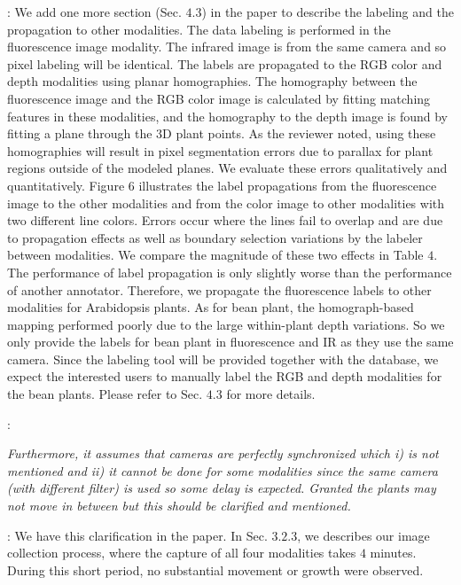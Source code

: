 \documentclass[11pt,letterpaper]{article}
\newcounter{reviewcounter}
\newenvironment{review}
{\noindent {\bf Comment~\arabic{reviewcounter}}:\addtocounter{reviewcounter}{1}\itshape}
{\vspace{0.8em}}
\newenvironment{response}
{\noindent {\bf Response}: \color{black}}
{\color{black} \vspace{1.6em}}
\begin{document}
\begin{response}
We add one more section (Sec. $4.3$) in the paper to describe the labeling and the propagation to other modalities.
The data labeling is performed in the fluorescence image modality.
The infrared image is from the same camera and so pixel labeling will be identical.
The labels are propagated to the RGB color and depth modalities using planar homographies.
The homography between the fluorescence image and the RGB color image is calculated by fitting matching features in these modalities, and the homography to the depth image is found by fitting a plane through the $3$D plant points.
As the reviewer noted, using these homographies will result in pixel segmentation errors due to parallax for plant regions outside of the modeled planes.
We evaluate these errors qualitatively and quantitatively.
Figure $6$ illustrates the label propagations from the fluorescence image to the other modalities and from the color image to other modalities with two different line colors.
Errors occur where the lines fail to overlap and are due to propagation effects as well as boundary selection variations by the labeler between modalities.
We compare the magnitude of these two effects in Table $4$.
The performance of label propagation is only slightly worse than the performance of another annotator.
Therefore, we propagate the fluorescence labels to other modalities for Arabidopsis plants.
As for bean plant, the homograph-based mapping performed poorly due to the large within-plant depth variations.
So we only provide the labels for bean plant in fluorescence and IR as they use the same camera.
Since the labeling tool will be provided together with the database, we expect the interested users to manually label the RGB and depth modalities for the bean plants.
Please refer to Sec. $4.3$ for more details.
\end{response}


\begin{review}
Furthermore, it assumes that cameras are perfectly synchronized which i) is not mentioned and ii) it cannot be done for some modalities since the same camera (with different filter) is used so some delay is expected.
Granted the plants may not move in between but this should be clarified and mentioned.
\end{review}

\begin{response}
We have this clarification in the paper.
In Sec. $3.2.3$, we describes our image collection process, where the capture of all four modalities takes $4$ minutes.
During this short period, no substantial movement or growth were observed.
\end{response}
\end{document}
